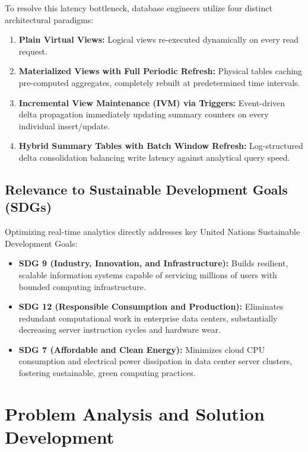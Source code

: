 \documentclass[11pt,a4paper]{report}
\begin{document}
To resolve this latency bottleneck, database engineers utilize four distinct architectural paradigms:
\begin{enumerate}
    \item \textbf{Plain Virtual Views:} Logical views re-executed dynamically on every read request.
    \item \textbf{Materialized Views with Full Periodic Refresh:} Physical tables caching pre-computed aggregates, completely rebuilt at predetermined time intervals.
    \item \textbf{Incremental View Maintenance (IVM) via Triggers:} Event-driven delta propagation immediately updating summary counters on every individual insert/update.
    \item \textbf{Hybrid Summary Tables with Batch Window Refresh:} Log-structured delta consolidation balancing write latency against analytical query speed.
\end{enumerate}

\subsection{Relevance to Sustainable Development Goals (SDGs)}
Optimizing real-time analytics directly addresses key United Nations Sustainable Development Goals:
\begin{itemize}
    \item \textbf{SDG 9 (Industry, Innovation, and Infrastructure):} Builds resilient, scalable information systems capable of servicing millions of users with bounded computing infrastructure.
    \item \textbf{SDG 12 (Responsible Consumption and Production):} Eliminates redundant computational work in enterprise data centers, substantially decreasing server instruction cycles and hardware wear.
    \item \textbf{SDG 7 (Affordable and Clean Energy):} Minimizes cloud CPU consumption and electrical power dissipation in data center server clusters, fostering sustainable, green computing practices.
\end{itemize}


\section{Problem Analysis and Solution Development}
\end{document}
